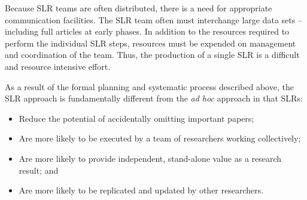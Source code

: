 Because SLR teams are often distributed, there is a need for appropriate communication facilities.  
The SLR team often must interchange large data sets -- including full articles at early phases.
In addition to the resources required to perform the individual SLR steps, resources must be expended on management and coordination of the team.
Thus, the production of a single SLR is a difficult and resource intensive effort.

As a result of the formal planning and systematic process described above, the SLR approach is fundamentally different from the \textit{ad hoc} approach in that SLRs:
\vspace{-8pt}
\begin{itemize} 
	\item Reduce the potential of accidentally omitting important papers;
	\vspace{-8pt}
	\item Are more likely to be executed by a team of researchers working collectively;
	\vspace{-8pt}
	\item Are more likely to provide independent, stand-alone value as a research result; and
	\vspace{-8pt}
	\item Are more likely to be replicated and updated by other researchers.
\end{itemize}
\vspace{-4pt}